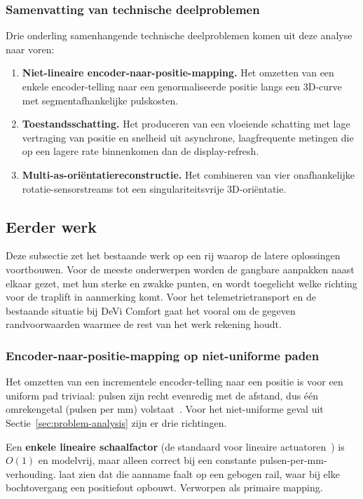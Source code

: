 \documentclass[10pt, a4paper, twocolumn]{article}
\begin{document}
\subsubsection{Samenvatting van technische deelproblemen}
Drie onderling samenhangende technische deelproblemen komen uit deze analyse
naar voren:
\begin{enumerate}[leftmargin=*]
  \item \textbf{Niet-lineaire encoder-naar-positie-mapping.} Het omzetten van een
    enkele encoder-telling naar een genormaliseerde positie langs een
    3D-curve met segmentafhankelijke pulskosten.
  \item \textbf{Toestandsschatting.} Het produceren van een vloeiende
    schatting met lage vertraging van positie en snelheid uit asynchrone,
    laagfrequente metingen die op een lagere rate binnenkomen dan de display-refresh.
  \item \textbf{Multi-as-oriëntatiereconstructie.} Het combineren van vier
    onafhankelijke rotatie-sensorstreams tot een singulariteitsvrije
    3D-oriëntatie.
\end{enumerate}

\subsection{Eerder werk}
\label{sec:prior-work}

Deze subsectie zet het bestaande werk op een rij waarop de latere oplossingen
voortbouwen. Voor de meeste onderwerpen worden de gangbare aanpakken naast elkaar
gezet, met hun sterke en zwakke punten, en wordt toegelicht welke richting voor de
traplift in aanmerking komt. Voor het telemetrietransport en de bestaande situatie
bij DeVi Comfort gaat het vooral om de gegeven randvoorwaarden waarmee de rest van
het werk rekening houdt.

\subsubsection{Encoder-naar-positie-mapping op niet-uniforme paden}
Het omzetten van een incrementele encoder-telling naar een positie is voor een
uniform pad triviaal: pulsen zijn recht evenredig met de afstand, dus één
omrekengetal (pulsen per mm) volstaat~\cite{bolton2019mechatronics,
elmenreich2002sensorfusion}. Voor het niet-uniforme geval uit
Sectie~\ref{sec:problem-analysis} zijn er drie richtingen.

Een \textbf{enkele lineaire schaalfactor} (de standaard voor lineaire
actuatoren~\cite{elmenreich2002sensorfusion}) is $O(1)$ en modelvrij, maar alleen
correct bij een constante pulsen-per-mm-verhouding. \cite{merry2010encoder} laat
zien dat die aanname faalt op een gebogen rail, waar bij elke bochtovergang een
positiefout opbouwt. Verworpen als primaire mapping.
\end{document}
